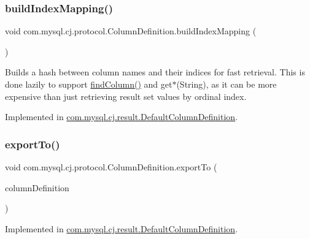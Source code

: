 \subsubsection{\texorpdfstring{build\+Index\+Mapping()}{buildIndexMapping()}}
{\footnotesize\ttfamily void com.\+mysql.\+cj.\+protocol.\+Column\+Definition.\+build\+Index\+Mapping (\begin{DoxyParamCaption}{ }\end{DoxyParamCaption})}

Builds a hash between column names and their indices for fast retrieval. This is done lazily to support \mbox{\hyperlink{interfacecom_1_1mysql_1_1cj_1_1protocol_1_1_column_definition_a9082cb797c01aec299496d0d2fe41528}{find\+Column()}} and get$\ast$(String), as it can be more expensive than just retrieving result set values by ordinal index. 

Implemented in \mbox{\hyperlink{classcom_1_1mysql_1_1cj_1_1result_1_1_default_column_definition_a765750a709687a3a53d1fe1fa9891c96}{com.\+mysql.\+cj.\+result.\+Default\+Column\+Definition}}.

\mbox{\label{interfacecom_1_1mysql_1_1cj_1_1protocol_1_1_column_definition_ae382d41d473df7f74ce51d22c18b1aa6}} 
\subsubsection{\texorpdfstring{export\+To()}{exportTo()}}
{\footnotesize\ttfamily void com.\+mysql.\+cj.\+protocol.\+Column\+Definition.\+export\+To (\begin{DoxyParamCaption}\item[{\mbox{\hyperlink{interfacecom_1_1mysql_1_1cj_1_1protocol_1_1_column_definition}{Column\+Definition}}}]{column\+Definition }\end{DoxyParamCaption})}



Implemented in \mbox{\hyperlink{classcom_1_1mysql_1_1cj_1_1result_1_1_default_column_definition_a9997f7a2813bccae2ad368156b7b3cbc}{com.\+mysql.\+cj.\+result.\+Default\+Column\+Definition}}.

\mbox{\label{interfacecom_1_1mysql_1_1cj_1_1protocol_1_1_column_definition_a9082cb797c01aec299496d0d2fe41528}} 
